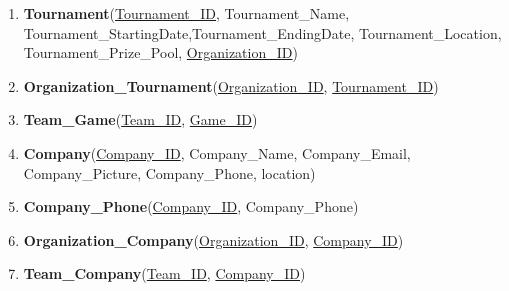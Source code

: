\begin{enumerate}
    \item \textbf{Tournament}(\underline{Tournament\_ID}, Tournament\_Name, Tournament\_StartingDate,Tournament\_EndingDate, Tournament\_Location, Tournament\_Prize\_Pool, \underline{Organization\_ID})
    \item \textbf{Organization\_Tournament}(\underline{Organization\_ID}, \underline{Tournament\_ID})


    \item \textbf{Team\_Game}(\underline{Team\_ID}, \underline{Game\_ID})


    \item \textbf{Company}(\underline{Company\_ID}, Company\_Name, Company\_Email, Company\_Picture, Company\_Phone, location)
    \item \textbf{Company\_Phone}(\underline{Company\_ID}, Company\_Phone)
    \item \textbf{Organization\_Company}(\underline{Organization\_ID}, \underline{Company\_ID})


    \item \textbf{Team\_Company}(\underline{Team\_ID}, \underline{Company\_ID})
\end{enumerate}